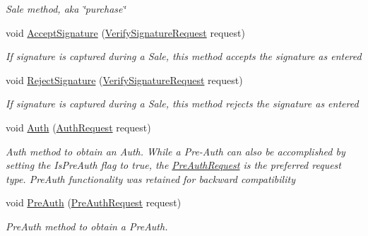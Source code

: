 \begin{DoxyCompactItemize}
\begin{DoxyCompactList}\small\item\em Sale method, aka \char`\"{}purchase\char`\"{} \end{DoxyCompactList}\item 
void \hyperlink{classcom_1_1clover_1_1remotepay_1_1sdk_1_1_clover_connector_a2d54a7e1d05451c3335fe31337a56ea4}{Accept\+Signature} (\hyperlink{classcom_1_1clover_1_1remotepay_1_1sdk_1_1_verify_signature_request}{Verify\+Signature\+Request} request)
\begin{DoxyCompactList}\small\item\em If signature is captured during a Sale, this method accepts the signature as entered \end{DoxyCompactList}\item 
void \hyperlink{classcom_1_1clover_1_1remotepay_1_1sdk_1_1_clover_connector_a8a86e1d3994b81424b06e0846f52dc29}{Reject\+Signature} (\hyperlink{classcom_1_1clover_1_1remotepay_1_1sdk_1_1_verify_signature_request}{Verify\+Signature\+Request} request)
\begin{DoxyCompactList}\small\item\em If signature is captured during a Sale, this method rejects the signature as entered \end{DoxyCompactList}\item 
void \hyperlink{classcom_1_1clover_1_1remotepay_1_1sdk_1_1_clover_connector_a2ae641aff3f22e4c5fa651d8deaa7bbd}{Auth} (\hyperlink{classcom_1_1clover_1_1remotepay_1_1sdk_1_1_auth_request}{Auth\+Request} request)
\begin{DoxyCompactList}\small\item\em Auth method to obtain an Auth. While a Pre-\/\+Auth can also be accomplished by setting the Is\+Pre\+Auth flag to true, the \hyperlink{classcom_1_1clover_1_1remotepay_1_1sdk_1_1_pre_auth_request}{Pre\+Auth\+Request} is the preferred request type. Pre\+Auth functionality was retained for backward compatibility \end{DoxyCompactList}\item 
void \hyperlink{classcom_1_1clover_1_1remotepay_1_1sdk_1_1_clover_connector_ab770dbea796bfc3ffa1d0ed999d04b48}{Pre\+Auth} (\hyperlink{classcom_1_1clover_1_1remotepay_1_1sdk_1_1_pre_auth_request}{Pre\+Auth\+Request} request)
\begin{DoxyCompactList}\small\item\em Pre\+Auth method to obtain a Pre\+Auth. \end{DoxyCompactList}\item 

\end{DoxyCompactItemize}
